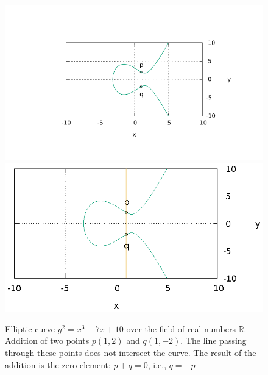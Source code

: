 \begin{figure}
\centering
\ifpdf
\includegraphics[angle=0,scale=1.5]
{./elliptic/picellipticsumeq.pdf}
\else
\includegraphics[angle=0,scale=1.5]
{./elliptic/picellipticsumeq.eps}
\fi
\caption{Elliptic curve $y^2 = x^3 -7 x + 10$ over the field of real numbers $\mathbb{R}$. Addition of two points $p(1,2)$ and $q(1,-2)$. The line passing through these points does not intersect the curve. The result of the addition is the zero element: $p + q = 0$, i.e., $q = -p$}
\label{fig:add:ellipticRsumEq}
\end{figure}
